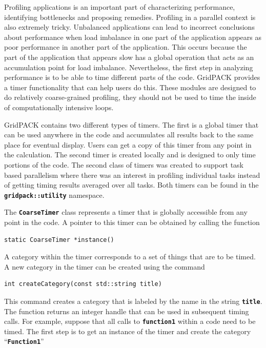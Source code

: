 \documentclass[12pt]{report} %
\begin{document}
Profiling applications is an important part of characterizing performance, identifying bottlenecks and proposing remedies. Profiling in a parallel context is also extremely tricky. Unbalanced applications can lead to incorrect conclusions about performance when load imbalance in one part of the application appears as poor performance in another part of the application. This occurs because the part of the application that appears slow has a global operation that acts as an accumulation point for load imbalance. Nevertheless, the first step in analyzing performance is to be able to time different parts of the code. GridPACK provides a timer functionality that can help users do this. These modules are designed to do relatively coarse-grained profiling, they should not be used to time the inside of computationally intensive loops.

GridPACK contains two different types of timers. The first is a global timer that can be used anywhere in the code and accumulates all results back to the same place for eventual display. Users can get a copy of this timer from any point in the calculation. The second timer is created locally and is designed to only time portions of the code. The second class of timers was created to support task based parallelism where there was an interest in profiling individual tasks instead of getting timing results averaged over all tasks. Both timers can be found in the \texttt{\textbf{gridpack::utility}} namespace.

The \texttt{\textbf{CoarseTimer}} class represents a timer that is globally accessible from any point in the code. A pointer to this timer can be obtained by calling the function

{
\color{red}
\begin{Verbatim}[fontseries=b]
static CoarseTimer *instance()
\end{Verbatim}
}

A category within the timer corresponds to a set of things that are to be timed. A new category in the timer can be created using the command

{
\color{red}
\begin{Verbatim}[fontseries=b]
int createCategory(const std::string title)
\end{Verbatim}
}

This command creates a category that is labeled by the name in the string \texttt{\textbf{title}}. The function returns an integer handle that can be used in subsequent timing calls. For example, suppose that all calls to \texttt{\textbf{function1}} within a code need to be timed. The first step is to get an instance of the timer and create the category ``\texttt{\textbf{Function1}}''
\end{document}
